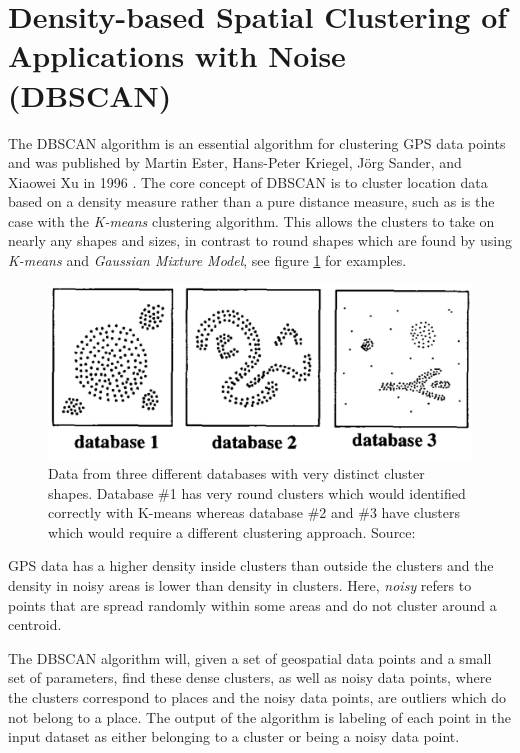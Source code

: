 \section{Density-based Spatial Clustering of Applications with Noise (DBSCAN)}
The DBSCAN algorithm is an essential algorithm for clustering GPS data points and was published by Martin Ester, Hans-Peter Kriegel, Jörg Sander, and Xiaowei Xu in 1996 \cite{density-based-1996}. The core concept of DBSCAN is to cluster location data based on a density measure rather than a pure distance measure, such as is the case with the \textit{K-means} clustering algorithm. This allows the clusters to take on nearly any shapes and sizes, in contrast to round shapes which are found by using \textit{K-means} and \textit{Gaussian Mixture Model}, see figure \ref{fig:dbscan_shapes} for examples.

\begin{figure}
    \centering
    \includegraphics[width=\textwidth]{images/dbscan-clusters.png}
    \caption{Data from three different databases with very distinct cluster shapes. Database \#1 has very round clusters which would identified correctly with K-means whereas database \#2 and \#3 have clusters which would require a different clustering approach. Source: \cite{density-based-1996}}
    \label{fig:dbscan_shapes}
\end{figure}

GPS data has a higher density inside clusters than outside the clusters and the density in noisy areas is lower than density in clusters. Here, \textit{noisy} refers to points that are spread randomly within some areas and do not cluster around a centroid.

The DBSCAN algorithm will, given a set of geospatial data points and a small set of parameters, find these dense clusters, as well as noisy data points, where the clusters correspond to places and the noisy data points, are outliers which do not belong to a place. The output of the algorithm is labeling of each point in the input dataset as either belonging to a cluster or being a noisy data point.

